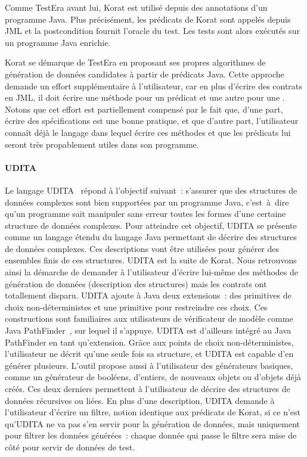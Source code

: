 Comme TestEra avant lui, Korat est utilisé depuis des annotations d'un programme
Java. Plus précisément, les prédicats de Korat sont appelés depuis JML et la
postcondition fournit l'oracle du test. Les tests sont alors exécutés sur un
programme Java enrichie.

Korat se démarque de TestEra en proposant ses propres algorithmes de génération
de données candidates à partir de prédicats Java. Cette approche demande un
effort supplémentaire à l'utilisateur, car en plus d'écrire des contrats en JML,
il doit écrire une méthode pour un prédicat et une autre pour une
. Notons que cet effort est partiellement compensé par
le fait que, d'une part, écrire des spécifications est une bonne pratique, et
que d'autre part, l'utilisateur connaît déjà le langage dans lequel écrire ces
méthodes et que les prédicats lui seront très propablement utiles dans son
programme.

\paragraph{UDITA} Le langage UDITA~ répond à l'objectif
suivant~: s'assurer que des structures de données complexes sont bien supportées
par un programme Java, c'est~à~dire qu'un programme sait manipuler sans erreur
toutes les formes d'une certaine structure de données complexes.  Pour atteindre
cet objectif, UDITA se présente comme un langage étendu du langage Java
permettant de décrire des structures de données complexes. Ces descriptions vont
être utilisées pour générer des ensembles finis de ces structures. UDITA est la
suite de Korat. Nous retrouvons ainsi la démarche de demander à l'utilisateur
d'écrire lui-même des méthodes de génération de données (description des
structures) mais les contrats ont totallement disparu. UDITA ajoute à Java deux
extensions~: des primitives de choix non-déterministes et une primitive pour
restreindre ces choix. Ces constructions sont familiaires aux utilisateurs de
vérificateur de modèle comme Java PathFinder~, sur lequel il
s'appuye. UDITA est d'ailleurs intégré au  Java PathFinder
en tant qu'extension. Grâce aux points de choix non-déterministes, l'utilisateur
ne décrit qu'une seule fois sa structure, et UDITA est capable d'en générer
plusieurs. L'outil propose aussi à l'utilisateur des générateurs basiques, comme
un générateur de booléens, d'entiers, de nouveaux objets ou d'objets déjà créés.
Ces deux derniers permettent à l'utilisateur de décrire des structures de
données récursives ou liées. En plus d'une description, UDITA demande à
l'utilisateur d'écrire un filtre, notion identique aux prédicats de Korat, si ce
n'est qu'UDITA ne va pas s'en servir pour la génération de données, mais
uniquement pour filtrer les données générées~: chaque donnée qui passe le filtre
sera mise de côté pour servir de données de test.

